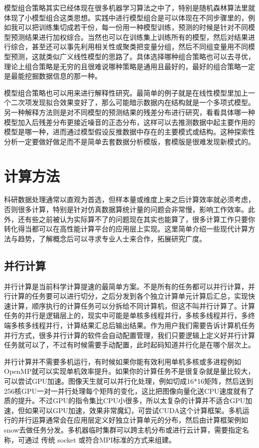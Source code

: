 \documentclass[]{tufte-book}
\begin{document}
模型组合策略其实已经体现在很多机器学习算法之中了，特别是随机森林算法里就体现了小模型组合这类思想。实践中进行模型组合是可以体现在不同步骤里的，例如我可以把训练集切成若干份，每一份用一种模型训练，预测的时候是针对不同模型预测结果进行加权综合。当然也可以在训练集上训练所有的模型，然后对结果进行综合，甚至还可以事先利用相关性或聚类把变量分组，然后不同组变量用不同模型预测，这就类似广义线性模型的思路了。具体选择哪种组合策略也可以去寻优，理论上组合策略是无穷的且很难说哪种策略是通用且最好的，最好的组合策略一定是最能挖掘数据信息的那一种。

模型组合策略也可以用来进行解释性研究。最简单的例子就是在线性模型里加上一个二次项发现拟合效果变好了，那么可能暗示数据内在结构就是一个多项式模型。另一种解释方法则是对不同模型的预测结果的残差分布进行研究，看看具体哪一种模型加入后残差分布更接近噪音的正态分布，这样可以去推测数据中起主要作用的模型是哪一种，进而通过模型假设反推数据中存在的主要模式或结构。这种探索性分析一定要做好做足而不是简单去套数据分析模版，套模版是很难发现新模式的。

\hypertarget{ux8ba1ux7b97ux65b9ux6cd5}{%
\section{计算方法}\label{ux8ba1ux7b97ux65b9ux6cd5}}

科研数据处理通常以直观为首选，但样本量或维度上来之后计算效率就必须考虑，否则很多计算，特别是针对仿真数据算统计量的问题会非常慢，影响工作效率。此外，还有些之前被认为实际算不了的问题现在其实也能算了，很多计算工作只要你转化得当都可以在高性能计算平台的应用层上实现。这里简单介绍一些现代计算方法与趋势，了解概念后可以寻求专业人士来合作，拓展研究广度。

\hypertarget{ux5e76ux884cux8ba1ux7b97}{%
\subsection{并行计算}\label{ux5e76ux884cux8ba1ux7b97}}

并行计算是当前科学计算提速的最简单方案。不是所有的任务都可以并行计算，并行计算的任务要可以进行切分，之后分发到各个独立计算单元计算后汇总，实现快速计算，顺序执行的计算任务可以分拆给不同计算机，但这不叫并行计算了。计算任务的并行是逻辑层上的，现实中可能是单核多线程并行，多核多线程并行，多终端多核多线程并行，计算结果汇总后输出结果。作为用户我们需要告诉计算机任务并行方式，很多并行计算的软件会自动配置管理，我们只要逻辑上定义好并行计算任务就可以了，不过有时候需要手动配置，此时起码知道并行化是在哪个层次上。

并行计算并不需要多机运行，有时候如果你能有效利用单机多核或多进程例如OpenMP就可以实现单机效率提升。如果你的计算任务不是很复杂就是量比较大，可以尝试GPU加速。图像天生就可以并行化处理，例如切成16*16矩阵，然后送到256核GPU一对一并行处理每个矩阵的变化，这比把图像向量化送CPU速度就有了质的提升。不过GPU的指令集比CPU小很多，所以太复杂的计算并不适合GPU加速，但如果可以GPU加速，效果非常魔幻，可尝试CUDA这个计算框架。多机运行的并行运算通常会在应用层定义好独立计算单元的分布，然后由计算框架例如snow去做任务分发。多机器临时集群可以跨主机分布或进行云计算，需要指定名称，可通过 传统 socket 或符合MPI标准的方式来组建。
\end{document}
